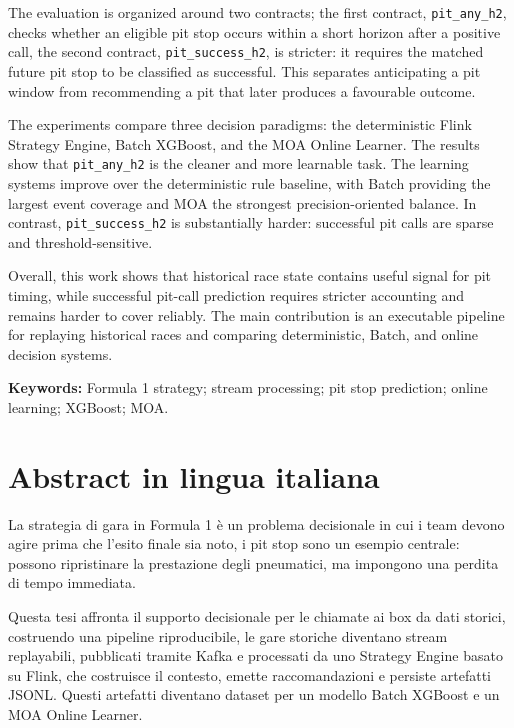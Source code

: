 \documentclass{Configuration_Files/PoliMi3i_thesis}
\begin{document}
The evaluation is organized around two contracts; the first contract, \texttt{pit\_any\_h2}, checks whether an eligible pit stop occurs
within a short horizon after a positive call, the second contract, \texttt{pit\_success\_h2}, is stricter: it requires the matched future pit stop to be classified as
successful. This separates anticipating a pit window from recommending a pit that later produces a favourable outcome.

The experiments compare three decision paradigms: the deterministic Flink Strategy Engine, Batch XGBoost, and the MOA Online Learner. The results show that \texttt{pit\_any\_h2}
is the cleaner and more learnable task. The learning systems improve over the deterministic rule baseline, with Batch providing the largest event coverage
and MOA the strongest precision-oriented balance. In contrast, \texttt{pit\_success\_h2} is substantially harder: successful pit calls are sparse
and threshold-sensitive.

Overall, this work shows that historical race state contains useful signal for pit timing, while successful pit-call prediction requires stricter accounting and remains harder
to cover reliably. The main contribution is an executable pipeline for replaying historical races and comparing deterministic, Batch, and online decision systems.

\vspace{1em}
\textbf{Keywords:} Formula 1 strategy; stream processing; pit stop prediction; online learning; XGBoost; MOA.




\chapter{Abstract in lingua italiana}

La strategia di gara in Formula 1 è un problema decisionale in cui i team devono agire prima che l'esito finale sia noto, i pit stop
sono un esempio centrale: possono ripristinare la prestazione degli pneumatici, ma impongono una perdita di tempo immediata.

Questa tesi affronta il supporto decisionale per le chiamate ai box da dati storici, costruendo una pipeline riproducibile, le gare storiche
diventano stream replayabili, pubblicati tramite Kafka e processati da uno Strategy Engine basato
su Flink, che costruisce il contesto, emette raccomandazioni e persiste artefatti JSONL. Questi artefatti
diventano dataset per un modello Batch XGBoost e un MOA Online Learner.
\end{document}
